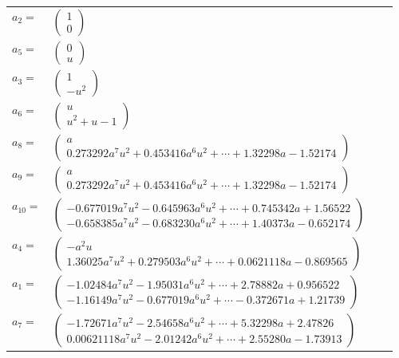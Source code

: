 \documentclass[1p]{elsarticle_modified}
\theoremstyle{definition}
\begin{document}
\begin{tabular}{m{7pt} m{180pt} m{7pt} m{180pt} }
\flushright $a_{2}=$&$\begin{pmatrix}1\\0\end{pmatrix}$ \\
\flushright $a_{5}=$&$\begin{pmatrix}0\\u\end{pmatrix}$ \\
\flushright $a_{3}=$&$\begin{pmatrix}1\\- u^2\end{pmatrix}$ \\
\flushright $a_{6}=$&$\begin{pmatrix}u\\u^2+u-1\end{pmatrix}$ \\
\flushright $a_{8}=$&$\begin{pmatrix}a\\0.273292 a^{7} u^{2}+0.453416 a^{6} u^{2}+\cdots+1.32298 a-1.52174\end{pmatrix}$ \\
\flushright $a_{9}=$&$\begin{pmatrix}a\\0.273292 a^{7} u^{2}+0.453416 a^{6} u^{2}+\cdots+1.32298 a-1.52174\end{pmatrix}$ \\
\flushright $a_{10}=$&$\begin{pmatrix}-0.677019 a^{7} u^{2}-0.645963 a^{6} u^{2}+\cdots+0.745342 a+1.56522\\-0.658385 a^{7} u^{2}-0.683230 a^{6} u^{2}+\cdots+1.40373 a-0.652174\end{pmatrix}$ \\
\flushright $a_{4}=$&$\begin{pmatrix}- a^2 u\\1.36025 a^{7} u^{2}+0.279503 a^{6} u^{2}+\cdots+0.0621118 a-0.869565\end{pmatrix}$ \\
\flushright $a_{1}=$&$\begin{pmatrix}-1.02484 a^{7} u^{2}-1.95031 a^{6} u^{2}+\cdots+2.78882 a+0.956522\\-1.16149 a^{7} u^{2}-0.677019 a^{6} u^{2}+\cdots-0.372671 a+1.21739\end{pmatrix}$ \\
\flushright $a_{7}=$&$\begin{pmatrix}-1.72671 a^{7} u^{2}-2.54658 a^{6} u^{2}+\cdots+5.32298 a+2.47826\\0.00621118 a^{7} u^{2}-2.01242 a^{6} u^{2}+\cdots+2.55280 a-1.73913\end{pmatrix}$ \\

\end{tabular}
\end{document}
